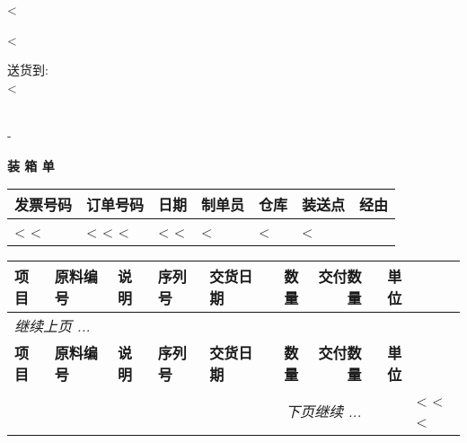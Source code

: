 <%


\begin{CJK}{UTF8}{arialuni}

\vspace*{-3.3cm}
<%
\vspace*{1.5cm}

\hspace{.55\textwidth}

\parbox[t]{.55\textwidth}{
送货到: \\
<%
}

\hfill \\
-
\vspace{1.0cm}

\centerline{\large\bf{装 箱 单}}
\normalsize
\hfill

\vspace{1cm}

\begin{tabularx}{\textwidth}{*{7}{|X}|} \hline
  \textbf{发票号码} & \textbf{订单号码} & \textbf{日期} & \textbf{制单员} 
	& \textbf{仓库}
  & \textbf{装送点} & \textbf{经由} \\ [0.5em]
  \hline
  <%
  <%
  & <%
  <%
  <%
  & <%
  <%
  & <%
  & <%
  & <%
  \hline
\end{tabularx}

\vspace{1cm}

\begin{longtable}{|ll p{5.5cm} l @{\extracolsep\fill} lrrr|} \hline
\xstrut
  \textbf{项目} & \textbf{原料编号} & \textbf{说明} & \textbf{序列号} & \textbf{交货日期} &
	\textbf{数量} & \textbf{交付数量} & \textbf{単位} \\ [0.5em]     
  \hline
\endfirsthead

  \multicolumn{7}{l}{\emph{继续上页 ...}} \\
  \hline
  \textbf{项目} & \textbf{原料编号} & \textbf{说明} & \textbf{序列号} & \textbf{交货日期} &
	\textbf{数量} & \textbf{交付数量} & \textbf{単位} \\ [0.5em]     
  \hline
\endhead
   \hline \multicolumn{7}{r}{\emph{下页继续 ...}}
\endfoot
   \hline 
\endlastfoot
<%
  <%
  <%
  <%
		& & <%
	<%
<%
\end{longtable}


\end{CJK}
